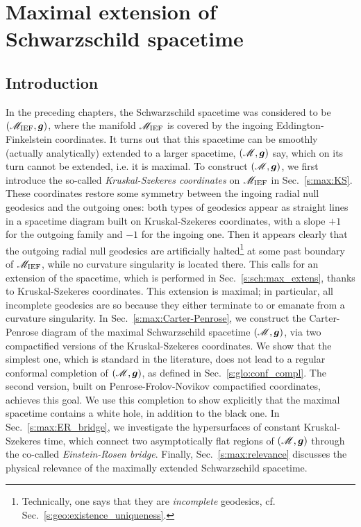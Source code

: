 \chapter{Maximal extension of Schwarzschild spacetime}
\label{s:max}

\minitoc

\section{Introduction}

In the preceding chapters, the Schwarzschild spacetime was considered
to be $(\mathscr{M}_{\rm IEF}, \bm{g})$, where the manifold $\mathscr{M}_{\rm IEF}$
is covered by the ingoing
Eddington-Finkelstein coordinates. It turns out that this spacetime
can be smoothly (actually analytically) extended to a larger spacetime,
$(\mathscr{M},\bm{g})$ say, which on its turn cannot be extended, i.e. it is maximal.
To construct $(\mathscr{M},\bm{g})$, we first introduce the so-called \emph{Kruskal-Szekeres
coordinates} on $\mathscr{M}_{\rm IEF}$ in Sec.~\ref{s:max:KS}.
These coordinates restore some symmetry between the ingoing
radial null geodesics and the outgoing ones: both types of geodesics appear
as straight lines in a spacetime diagram built on Kruskal-Szekeres coordinates,
with a slope $+1$ for the outgoing family and $-1$ for the ingoing one.
Then it appears clearly that the outgoing radial null geodesics are artificially
halted\footnote{Technically, one says that they are \emph{incomplete} geodesics, cf. Sec.~\ref{s:geo:existence_uniqueness}.}
at some past boundary of $\mathscr{M}_{\rm IEF}$, while no curvature singularity is located there.
This calls for an extension of the spacetime, which is performed
in Sec.~\ref{s:sch:max_extens}, thanks to Kruskal-Szekeres coordinates.
This extension is maximal; in particular, all
incomplete geodesics are so because they either terminate to or emanate from a
curvature singularity. In Sec.~\ref{s:max:Carter-Penrose}, we
construct the Carter-Penrose diagram of the maximal Schwarzschild spacetime $(\mathscr{M},\bm{g})$,
via two compactified versions of the Kruskal-Szekeres coordinates.
We show that the simplest one, which is standard in the literature,
does not lead to a regular conformal completion
of $(\mathscr{M},\bm{g})$, as defined in Sec.~\ref{s:glo:conf_compl}.
The second version, built on Penrose-Frolov-Novikov compactified coordinates,
achieves this goal. We use this completion to show explicitly that the maximal
spacetime contains a white hole, in addition to the black one.
In Sec.~\ref{s:max:ER_bridge}, we investigate the hypersurfaces of
constant Kruskal-Szekeres time, which connect two asymptotically flat regions
of $(\mathscr{M},\bm{g})$ through the co-called \emph{Einstein-Rosen bridge}.
Finally, Sec.~\ref{s:max:relevance} discusses the physical relevance
of the maximally extended Schwarzschild spacetime.

